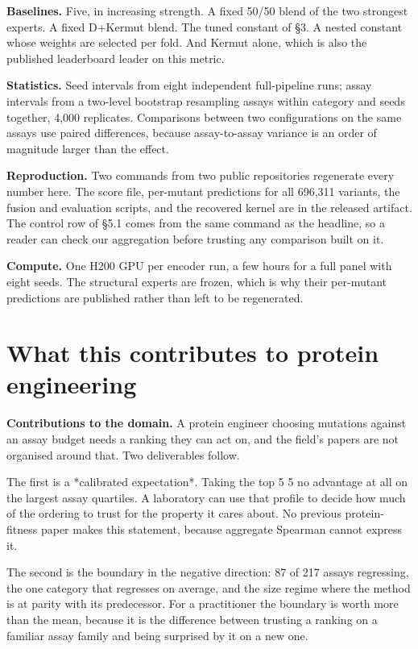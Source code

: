 \documentclass{article}
\begin{document}
\textbf{Baselines.} Five, in increasing strength. A fixed 50/50 blend of the two strongest experts. A fixed
D+Kermut blend. The tuned constant of §3. A nested constant whose weights are selected per fold. And
Kermut alone, which is also the published leaderboard leader on this metric.

\textbf{Statistics.} Seed intervals from eight independent full-pipeline runs; assay intervals from a
two-level bootstrap resampling assays within category and seeds together, 4,000 replicates. Comparisons
between two configurations on the same assays use paired differences, because assay-to-assay variance is
an order of magnitude larger than the effect.

\textbf{Reproduction.} Two commands from two public repositories regenerate every number here. The score
file, per-mutant predictions for all 696,311 variants, the fusion and evaluation scripts, and the
recovered kernel are in the released artifact. The control row of §5.1 comes from the same command as
the headline, so a reader can check our aggregation before trusting any comparison built on it.

\textbf{Compute.} One H200 GPU per encoder run, a few hours for a full panel with eight seeds. The structural
experts are frozen, which is why their per-mutant predictions are published rather than left to be
regenerated.
\section{What this contributes to protein engineering}
\textbf{Contributions to the domain.} A protein engineer choosing mutations against an assay budget needs a
ranking they can act on, and the field's papers are not organised around that. Two deliverables follow.

The first is a *calibrated expectation*. Taking the top 5%
5%
no advantage at all on the largest assay quartiles. A laboratory can use that profile to decide how much
of the ordering to trust for the property it cares about. No previous protein-fitness paper makes this
statement, because aggregate Spearman cannot express it.

The second is the boundary in the negative direction: 87 of 217 assays regressing, the one category that
regresses on average, and the size regime where the method is at parity with its predecessor. For a
practitioner the boundary is worth more than the mean, because it is the difference between trusting a
ranking on a familiar assay family and being surprised by it on a new one.
\end{document}

